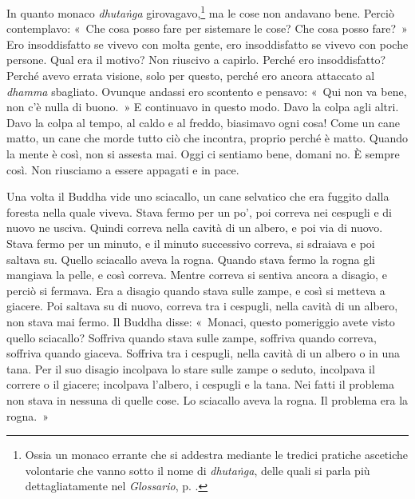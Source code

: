In quanto monaco \emph{dhutaṅga} girovagavo,\footnote{Ossia un monaco
  errante che si addestra mediante le tredici pratiche ascetiche
  volontarie che vanno sotto il nome di \emph{dhutaṅga}, delle quali si
  parla più dettagliatamente nel \emph{Glossario}, p. \pageref{glossary-dhutanga}.} ma le cose non
andavano bene. Perciò contemplavo: «~Che cosa posso fare per sistemare
le cose? Che cosa posso fare?~» Ero insoddisfatto se vivevo con molta
gente, ero insoddisfatto se vivevo con poche persone. Qual era il
motivo? Non riuscivo a capirlo. Perché ero insoddisfatto? Perché avevo
errata visione, solo per questo, perché ero ancora attaccato al
\emph{dhamma} sbagliato. Ovunque andassi ero scontento e pensavo: «~Qui
non va bene, non c'è nulla di buono.~» E continuavo in questo modo. Davo
la colpa agli altri. Davo la colpa al tempo, al caldo e al freddo,
biasimavo ogni cosa! Come un cane matto, un cane che morde tutto ciò che
incontra, proprio perché è matto. Quando la mente è così, non si assesta
mai. Oggi ci sentiamo bene, domani no. È sempre così. Non riusciamo a
essere appagati e in pace.

Una volta il Buddha vide uno sciacallo, un cane selvatico che era
fuggito dalla foresta nella quale viveva. Stava fermo per un po', poi
correva nei cespugli e di nuovo ne usciva. Quindi correva nella cavità
di un albero, e poi via di nuovo. Stava fermo per un minuto, e il minuto
successivo correva, si sdraiava e poi saltava su. Quello sciacallo aveva
la rogna. Quando stava fermo la rogna gli mangiava la pelle, e così
correva. Mentre correva si sentiva ancora a disagio, e perciò si
fermava. Era a disagio quando stava sulle zampe, e così si metteva a
giacere. Poi saltava su di nuovo, correva tra i cespugli, nella cavità
di un albero, non stava mai fermo. Il Buddha disse: «~Monaci, questo
pomeriggio avete visto quello sciacallo? Soffriva quando stava sulle
zampe, soffriva quando correva, soffriva quando giaceva. Soffriva tra i
cespugli, nella cavità di un albero o in una tana. Per il suo disagio
incolpava lo stare sulle zampe o seduto, incolpava il correre o il
giacere; incolpava l'albero, i cespugli e la tana. Nei fatti il problema
non stava in nessuna di quelle cose. Lo sciacallo aveva la rogna. Il
problema era la rogna.~»

